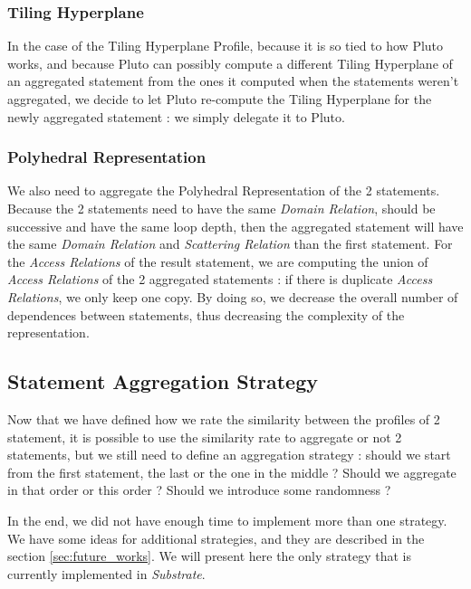 \documentclass[paper=a4, fontsize=11.5pt]{scrartcl}
\numberwithin{equation}{section}        %
\numberwithin{figure}{section}          %
\numberwithin{table}{section}               %
\begin{document}
        \subsubsection{Tiling Hyperplane}
            In the case of the Tiling Hyperplane Profile, because it is so tied to how
            Pluto works, and because Pluto can possibly compute a different Tiling Hyperplane
            of an aggregated statement from the ones it computed when the statements weren't
            aggregated, we decide to let Pluto re-compute the Tiling Hyperplane for the newly
            aggregated statement : we simply delegate it to Pluto.
        \subsubsection{Polyhedral Representation}
            We also need to aggregate the Polyhedral Representation of the 2 statements.
            Because the 2 statements need to have the same \textit{Domain Relation}, should be
            successive and have the same loop depth, then the aggregated statement will have
            the same \textit{Domain Relation} and \textit{Scattering Relation} than the first
            statement. For the \textit{Access Relations} of the result statement, we
            are computing the union of \textit{Access Relations} of the 2 aggregated statements :
            if there is duplicate \textit{Access Relations}, we only keep one copy.
            By doing so, we decrease the overall number of dependences between statements,
            thus decreasing the complexity of the representation.
            

    \subsection{Statement Aggregation Strategy}
        Now that we have defined how we rate the similarity between the profiles of 2 statement,
        it is possible to use the similarity rate to aggregate or not 2 statements, but
        we still need to define an aggregation strategy : should we start from the first
        statement, the last or the one in the middle ? Should we aggregate in that order
        or this order ? Should we introduce some randomness ?

        In the end, we did not have enough time to implement more than one strategy. We
        have some ideas for additional strategies, and they are described in the section
        \ref{sec:future_works}. We will present here the only strategy that is currently implemented
        in \textit{Substrate}.
\end{document}
